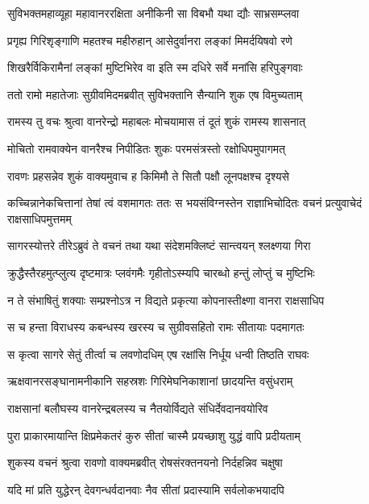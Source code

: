 \twolineshloka
{सुविभक्तमहाव्यूहा महावानररक्षिता}
{अनीकिनी सा विबभौ यथा द्यौः साभ्रसम्प्लवा} %

\twolineshloka
{प्रगृह्य गिरिशृङ्गाणि महतश्च महीरुहान्}
{आसेदुर्वानरा लङ्कां मिमर्दयिषवो रणे} %

\twolineshloka
{शिखरैर्विकिरामैनां लङ्कां मुष्टिभिरेव वा}
{इति स्म दधिरे सर्वे मनांसि हरिपुङ्गवाः} %

\twolineshloka
{ततो रामो महातेजाः सुग्रीवमिदमब्रवीत्}
{सुविभक्तानि सैन्यानि शुक एष विमुच्यताम्} %

\twolineshloka
{रामस्य तु वचः श्रुत्वा वानरेन्द्रो महाबलः}
{मोचयामास तं दूतं शुकं रामस्य शासनात्} %

\twolineshloka
{मोचितो रामवाक्येन वानरैश्च निपीडितः}
{शुकः परमसंत्रस्तो रक्षोधिपमुपागमत्} %

\twolineshloka
{रावणः प्रहसन्नेव शुकं वाक्यमुवाच ह}
{किमिमौ ते सितौ पक्षौ लूनपक्षश्च दृश्यसे} %

\threelineshloka
{कच्चिन्नानेकचित्तानां तेषां त्वं वशमागतः}
{ततः स भयसंविग्नस्तेन राज्ञाभिचोदितः}
{वचनं प्रत्युवाचेदं राक्षसाधिपमुत्तमम्} %

\twolineshloka
{सागरस्योत्तरे तीरेऽब्रुवं ते वचनं तथा}
{यथा संदेशमक्लिष्टं सान्त्वयन् श्लक्ष्णया गिरा} %

\twolineshloka
{क्रुद्धैस्तैरहमुत्प्लुत्य दृष्टमात्रः प्लवंगमैः}
{गृहीतोऽस्म्यपि चारब्धो हन्तुं लोप्तुं च मुष्टिभिः} %

\twolineshloka
{न ते संभाषितुं शक्याः सम्प्रश्नोऽत्र न विद्यते}
{प्रकृत्या कोपनास्तीक्ष्णा वानरा राक्षसाधिप} %

\twolineshloka
{स च हन्ता विराधस्य कबन्धस्य खरस्य च}
{सुग्रीवसहितो रामः सीतायाः पदमागतः} %

\twolineshloka
{स कृत्वा सागरे सेतुं तीर्त्वा च लवणोदधिम्}
{एष रक्षांसि निर्धूय धन्वी तिष्ठति राघवः} %

\twolineshloka
{ऋक्षवानरसङ्घानामनीकानि सहस्रशः}
{गिरिमेघनिकाशानां छादयन्ति वसुंधराम्} %

\twolineshloka
{राक्षसानां बलौघस्य वानरेन्द्रबलस्य च}
{नैतयोर्विद्यते संधिर्देवदानवयोरिव} %

\twolineshloka
{पुरा प्राकारमायान्ति क्षिप्रमेकतरं कुरु}
{सीतां चास्मै प्रयच्छाशु युद्धं वापि प्रदीयताम्} %

\twolineshloka
{शुकस्य वचनं श्रुत्वा रावणो वाक्यमब्रवीत्}
{रोषसंरक्तनयनो निर्दहन्निव चक्षुषा} %

\twolineshloka
{यदि मां प्रति युद्धेरन् देवगन्धर्वदानवाः}
{नैव सीतां प्रदास्यामि सर्वलोकभयादपि} %

